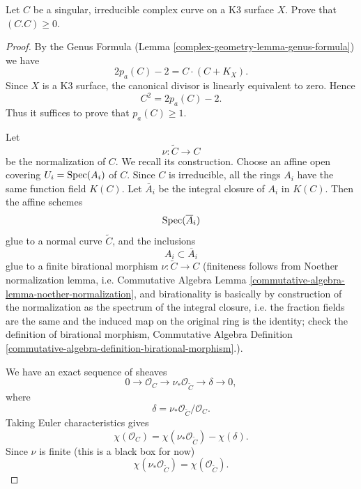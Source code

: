 \begin{exercise}
\label{exercise-singular-curve-on-k3}
Let $C$ be a singular, irreducible complex
curve on a K3 surface $X$. Prove that
$(C.C)\geq 0$.
\end{exercise}

\begin{proof}
By the Genus Formula
(Lemma
\ref{complex-geometry-lemma-genus-formula})
we have
$$
2p_a(C)-2 = C \cdot (C + K_X).
$$
Since $X$ is a K3 surface, the canonical
divisor is linearly equivalent to zero.
Hence
$$
C^2 = 2p_a(C)-2.
$$
Thus it suffices to prove that
$p_a(C) \geq 1$.

\medskip\noindent
Let
$$
\nu : \widetilde C \longrightarrow C
$$
be the normalization of $C$. We recall its
construction. Choose an affine open covering
$U_i = \mathop{\mathrm{Spec}}(A_i)$ of $C$. Since $C$ is
irreducible, all the rings $A_i$ have the
same function field $K(C)$. Let
$\overline A_i$ be the integral closure of
$A_i$ in $K(C)$. Then the affine schemes
$$
\mathop{\mathrm{Spec}}(\overline A_i)
$$
glue to a normal curve $\widetilde C$,
and the inclusions
$$
A_i \subset \overline A_i
$$
glue to a finite birational morphism
$\nu : \widetilde C \to C$
(finiteness follows
from Noether normalization lemma,
i.e. Commutative Algebra
Lemma \ref{commutative-algebra-lemma-noether-normalization},
and birationality is basically by
construction of the normalization
as the spectrum of the integral
closure, i.e. the fraction fields
are the same and the induced
map on the original ring is the identity;
check the definition of birational
morphism, Commutative Algebra Definition
\ref{commutative-algebra-definition-birational-morphism}.).

We have an exact sequence of sheaves
$$
0 \to \mathcal O_C
  \to \nu_*\mathcal O_{\widetilde C}
  \to \delta \to 0,
$$
where
$$
\delta =
\nu_*\mathcal O_{\widetilde C}/\mathcal O_C.
$$
Taking Euler characteristics gives
$$
\chi(\mathcal O_C)
=
\chi(\nu_*\mathcal O_{\widetilde C})
-
\chi(\delta).
$$
Since $\nu$ is finite (this is
a black box for now)
$$
\chi(\nu_*\mathcal O_{\widetilde C})
=
\chi(\mathcal O_{\widetilde C}).
$$


\end{proof}
